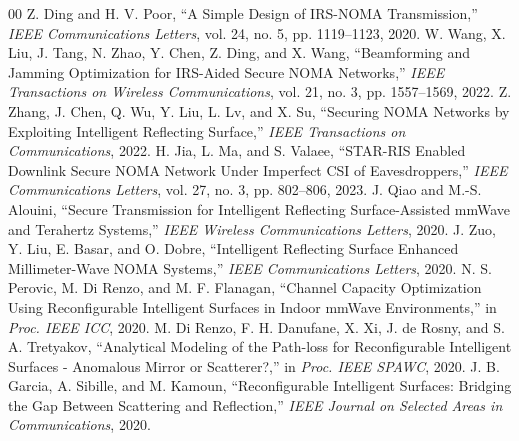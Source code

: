 \documentclass[journal]{IEEEtran}
\begin{document}
\begin{thebibliography}{00}
 Z. Ding and H. V. Poor, ``A Simple Design of IRS-NOMA Transmission,'' \emph{IEEE Communications Letters}, vol. 24, no. 5, pp. 1119--1123, 2020.
 W. Wang, X. Liu, J. Tang, N. Zhao, Y. Chen, Z. Ding, and X. Wang, ``Beamforming and Jamming Optimization for IRS-Aided Secure NOMA Networks,'' \emph{IEEE Transactions on Wireless Communications}, vol. 21, no. 3, pp. 1557--1569, 2022.
 Z. Zhang, J. Chen, Q. Wu, Y. Liu, L. Lv, and X. Su, ``Securing NOMA Networks by Exploiting Intelligent Reflecting Surface,'' \emph{IEEE Transactions on Communications}, 2022.
 H. Jia, L. Ma, and S. Valaee, ``STAR-RIS Enabled Downlink Secure NOMA Network Under Imperfect CSI of Eavesdroppers,'' \emph{IEEE Communications Letters}, vol. 27, no. 3, pp. 802--806, 2023.
 J. Qiao and M.-S. Alouini, ``Secure Transmission for Intelligent Reflecting Surface-Assisted mmWave and Terahertz Systems,'' \emph{IEEE Wireless Communications Letters}, 2020.
 J. Zuo, Y. Liu, E. Basar, and O. Dobre, ``Intelligent Reflecting Surface Enhanced Millimeter-Wave NOMA Systems,'' \emph{IEEE Communications Letters}, 2020.
 N. S. Perovic, M. Di Renzo, and M. F. Flanagan, ``Channel Capacity Optimization Using Reconfigurable Intelligent Surfaces in Indoor mmWave Environments,'' in \emph{Proc. IEEE ICC}, 2020.
 M. Di Renzo, F. H. Danufane, X. Xi, J. de Rosny, and S. A. Tretyakov, ``Analytical Modeling of the Path-loss for Reconfigurable Intelligent Surfaces - Anomalous Mirror or Scatterer?,'' in \emph{Proc. IEEE SPAWC}, 2020.
 J. B. Garcia, A. Sibille, and M. Kamoun, ``Reconfigurable Intelligent Surfaces: Bridging the Gap Between Scattering and Reflection,'' \emph{IEEE Journal on Selected Areas in Communications}, 2020.
\end{thebibliography}
\end{document}
